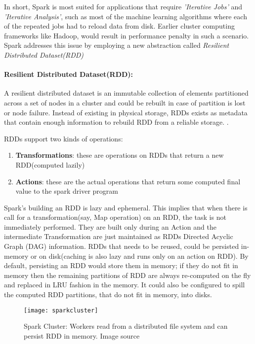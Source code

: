 \documentclass[article,type=msc,colorback,12pt,accentcolor=tud1d]{tudthesis}
\begin{document}
		   In short, Spark is most suited for applications that require \textit{'Iterative Jobs'} and \textit{'Iterative Analysis'}, such as most of the machine learning algorithms where each of the repeated jobs had to reload data from disk. Earlier cluster computing frameworks like Hadoop, would result in performance penalty in such a scenario. Spark addresses this issue by employing a new abstraction called \textit{Resilient Distributed Dataset(RDD)} \cite{sparkmainpaper}
		   
		   \paragraph{Resilient Distributed Dataset(RDD):}
		   
		   A resilient distributed dataset is an immutable collection of elements partitioned across a set of nodes in a cluster and could be rebuilt in case of partition is lost or node failure. Instead of existing in physical storage, RDDs exists as metadata that contain enough information to rebuild RDD from a reliable storage. \cite{sparkmainpaper}. 
		   
		   RDDs support two kinds of operations:
		   
		   \begin{enumerate}
		   	\item \textbf{Transformations}: these are operations on RDDs that return a new RDD(computed lazily)
		    \item \textbf{Actions}: these are the actual operations that return some computed final value to the spark driver program \cite{sparkbook}
		   \end{enumerate}
		   
		   Spark's building an RDD is lazy and ephemeral. This implies that when there is call for a transformation(say, Map operation) on an RDD, the task is not immediately performed. They are built only during an Action and the intermediate Transformation are just maintained as RDDs Directed Acyclic Graph (DAG) information. RDDs that needs to be reused, could be persisted in-memory or on disk(caching is also lazy and runs only on an action on RDD). By default, persisting an RDD would store them in memory; if they do not fit in memory then the remaining partitions of RDD are always re-computed on the fly and replaced in LRU fashion in the memory. It could also be configured to spill the computed RDD partitions, that do not fit in memory, into disks. 
		   
		   \begin{figure}[p]
			   	\centering
			   	\texttt{[image: sparkcluster]}
			   	\caption{Spark Cluster: Workers read from a distributed file system and can persist RDD in memory. Image source \cite{RDDmainpaper}  }
			   	\label{fig:sparkcluster}
		   \end{figure}
		   	   
\end{document}
